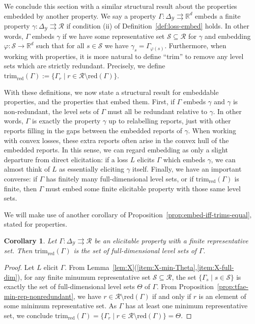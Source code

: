 \documentclass[11pt]{article}
\newcommand{\reals}{\mathbb{R}}
\newcommand{\simplex}{\Delta_\Y}
\newcommand{\R}{\mathcal{R}}
\newcommand{\Sc}{\mathcal{S}}
\newcommand{\Y}{\mathcal{Y}}
\newcommand{\toto}{\rightrightarrows}
\newcommand{\red}{\mathrm{red}}
\newcommand{\trimred}{\mathrm{trim}_\red}
\newtheorem{corollary}{Corollary}
\begin{document}
We conclude this section with a similar structural result about the properties embedded by another property.
We say a property $\Gamma:\simplex\toto\reals^d$ embeds a finite property $\gamma:\simplex\toto\R$ if condition (ii) of Definition~\ref{def:loss-embed} holds.
In other words, $\Gamma$ embeds $\gamma$ if we have some representative set $\Sc\subseteq\R$ for $\gamma$ and embedding $\varphi:\Sc\to\reals^d$ such that for all $s\in\Sc$ we have $\gamma_s = \Gamma_{\varphi(s)}$.
Furthermore, when working with properties, it is more natural to define ``trim'' to remove any level sets which are strictly redundant.
Precisely, we define $\trimred(\Gamma) := \{\Gamma_r \mid r \in \R\setminus\red(\Gamma)\}$.

With these definitions, we now state a structural result for embeddable properties, and the properties that embed them.
First, if $\Gamma$ embeds $\gamma$ and $\gamma$ is non-redundant, the level sets of $\Gamma$ must all be redundant relative to $\gamma$.
In other words, $\Gamma$ is exactly the property $\gamma$ up to relabelling reports, just with other reports filling in the gaps between the embedded reports of $\gamma$.
When working with convex losses, these extra reports often arise in the convex hull of the embedded reports.
In this sense, we can regard embedding as only a slight departure from direct elicitation: if a loss $L$ elicits $\Gamma$ which embeds $\gamma$, we can almost think of $L$ as essentially eliciting $\gamma$ itself.
Finally, we have an important converse: if $\Gamma$ has finitely many full-dimensional level sets, or if $\trimred(\Gamma)$ is finite, then $\Gamma$ must embed some finite elicitable property with those same level sets.

We will make use of another corollary of Proposition~\ref{prop:embed-iff-trims-equal}, stated for properties.
\begin{corollary}\label{cor:trim-prop-red}
  Let $\Gamma : \simplex \toto \R$ be an elicitable property with a finite representative set.
  Then $\trimred(\Gamma)$ is the set of full-dimensional level sets of $\Gamma$.
\end{corollary}
\begin{proof}
  Let $L$ elicit $\Gamma$.
  From Lemma~\ref{lem:X}(\ref{item:X-min-Theta},\ref{item:X-full-dim}), for any finite minumum representative set $\Sc\subseteq\R$, the set $\{\Gamma_s\mid s\in\Sc\}$ is exactly the set of full-dimensional level sets $\Theta$ of $\Gamma$.
  From Proposition~\ref{prop:tfae-min-rep-nonredundant}, we have $r \in \R\setminus \red(\Gamma)$ if and only if $r$ is an element of some minimum representative set.
  As $\Gamma$ has at least one minimum representative set, we conclude $\trimred(\Gamma) = \{\Gamma_r \mid r\in \R\setminus\red(\Gamma)\} = \Theta$.  
\end{proof}
\end{document}
